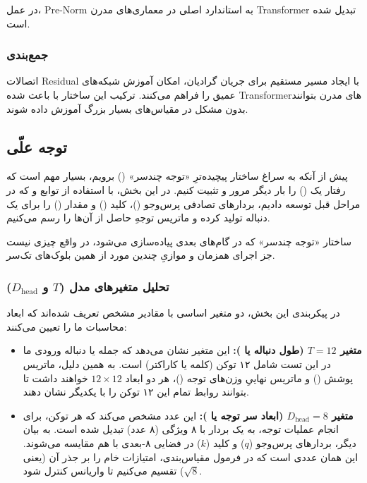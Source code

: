 \documentclass{article}
\begin{document}
در عمل، Pre-Norm به استاندارد اصلی در معماری‌های مدرن Transformer تبدیل شده است.

\subsubsection*{جمع‌بندی}

اتصالات Residual با ایجاد مسیر مستقیم برای جریان گرادیان، امکان آموزش شبکه‌های عمیق را فراهم می‌کنند. ترکیب این ساختار با  باعث شده Transformerهای مدرن بتوانند بدون مشکل در مقیاس‌های بسیار بزرگ آموزش داده شوند.

\subsection{ توجه علّی}

پیش از آنکه به سراغ ساختار پیچیده‌ترِ «توجه چندسر» () برویم، بسیار مهم است که رفتار یک () را بار دیگر مرور و تثبیت کنیم. در این بخش، با استفاده از توابع  و  که در مراحل قبل توسعه دادیم، بردارهای تصادفی پرس‌وجو ()، کلید () و مقدار () را برای یک دنباله تولید کرده و ماتریس توجهِ حاصل از آن‌ها را رسم می‌کنیم. 

ساختار «توجه چندسر» که در گام‌های بعدی پیاده‌سازی می‌شود، در واقع چیزی نیست جز اجرای همزمان و موازیِ چندین مورد از همین بلوک‌های تک‌سر.

\subsubsection*{تحلیل متغیرهای مدل ($T$ و $D_{\text{head}}$)}

در پیکربندی این بخش، دو متغیر اساسی با مقادیر مشخص تعریف شده‌اند که ابعاد محاسبات ما را تعیین می‌کنند:

\begin{itemize}
	\item \textbf{متغیر $T = 12$ (طول دنباله یا ):}
	این متغیر نشان می‌دهد که جمله یا دنباله ورودی ما در این تست شامل ۱۲ توکن (کلمه یا کاراکتر) است. به همین دلیل، ماتریس پوشش () و ماتریس نهاییِ وزن‌های توجه ()، هر دو ابعاد $12 \times 12$ خواهند داشت تا بتوانند روابط تمام این ۱۲ توکن را با یکدیگر نشان دهند.
	
	\item \textbf{متغیر $D_{\text{head}} = 8$ (ابعاد سر توجه یا ):}
	این عدد مشخص می‌کند که هر توکن، برای انجام عملیات توجه، به یک بردار با ۸ ویژگی (۸ عدد) تبدیل شده است. به بیان دیگر، بردارهای پرس‌وجو ($q$) و کلید ($k$) در فضایی ۸-بعدی با هم مقایسه می‌شوند. این همان عددی است که در فرمول مقیاس‌بندی، امتیازات خام را بر جذر آن (یعنی $\sqrt{8}$) تقسیم می‌کنیم تا واریانس کنترل شود.
\end{itemize}
\end{document}
